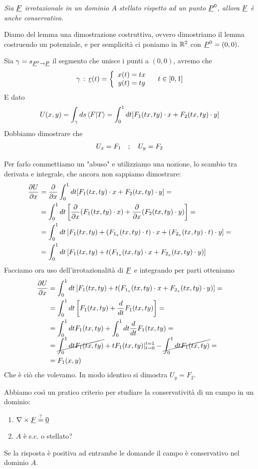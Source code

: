 \bigskip

\textit{Sia $\underline{F}$ irrotazionale in un dominio $A$ stellato rispetto ad un punto $\underline{P}^0$, allora $\underline{F}$ è anche conservativo.}

\bigskip

Diamo del lemma una dimostrazione costruttiva, ovvero dimostriamo il lemma costruendo un potenziale, e per semplicità ci poniamo in $\mathbb{R}^2$ con $\underline{P}^0=(0,0)$.

Sia $\gamma=s_{\underline{P}^0 \rightarrow\underline{P}}$ il segmento che unisce i punti a $(0,0)$, avremo che
\begin{align}
	\gamma \, : \, \underline{r}(t)=\left\{\begin{array}{cc} x(t)=tx \\ y(t)=ty \end{array}\right. \quad t\in[0,1]
\end{align}
E dato
\begin{align}
	U(x,y)= \int_{\gamma} ds \braket{F|T}= \int_{0}^{1} dt [F_1(tx,ty) \cdot x + F_2(tx,ty) \cdot y]
\end{align}
Dobbiamo dimostrare che
\begin{align}
	U_x=F_1 \quad ; \quad U_y=F_2
\end{align}

Per farlo commettiamo un "abuso" e utilizziamo una nozione, lo scambio tra derivata e integrale, che ancora non sappiamo dimostrare:
\begin{align}
	\frac{\partial U}{\partial x}{}&= \frac{\partial }{\partial x} \int_{0}^{1} dt [F_1(tx,ty) \cdot x + F_2(tx,ty) \cdot y] = \nonumber \\
	&=\int_{0}^{1} dt \left[\frac{\partial }{\partial x}(F_1(tx,ty) \cdot x) + \frac{\partial }{\partial x}(F_2(tx,ty) \cdot y)\right]= \nonumber \\
	&= \int_{0}^{1} dt \left[  F_1(tx,ty) + (F_{1_x}(tx,ty)\cdot t)\cdot x +  (F_{2_x}(tx,ty)\cdot t)\cdot y  \right]= \nonumber \\
	&= \int_{0}^{1} dt \left[  F_1(tx,ty) + t(F_{1_x}(tx,ty)\cdot x + F_{2_x}(tx,ty)\cdot y)  \right]
\end{align}
Facciamo ora uso dell'irrotazionalità di $\underline{F}$ e integrando per parti otteniamo
\begin{align}
	\frac{\partial U}{\partial x}{}&= \int_{0}^{1} dt \left[  F_1(tx,ty) + t(F_{1_x}(tx,ty)\cdot x + F_{2_x}(tx,ty)\cdot y)  \right]= \nonumber \\
	&= \int_{0}^{1} dt \left[  F_1(tx,ty) +  \frac{d }{d t}F_1(tx,ty)   \right] =\nonumber \\
	&= \int_{0}^{1} dt   F_1(tx,ty) +  \int_{0}^{1} dt  \frac{d }{d t}F_1(tx,ty) =  \nonumber \\
	&= \cancel{\int_{0}^{1} dt F_1(tx,ty)} + tF_1(tx,ty)|_{t=0}^{t=1} - \cancel{\int_{0}^{1} dt F_1(tx,ty)}= \nonumber \\
	&= F_1(x,y)
\end{align}
Che è ciò che volevamo. In modo identico si dimostra $U_y= F_2$.

\bigskip

Abbiamo così un pratico criterio per studiare la conservatività di un campo in un dominio:
\begin{enumerate}
	\item $\nabla \times \underline{F} \overset{?}{=} \underline{0}$
	\item $A$ è s.c. o stellato?
\end{enumerate}

Se la risposta è positiva ad entrambe le domande il campo è conservativo nel dominio $A$.
